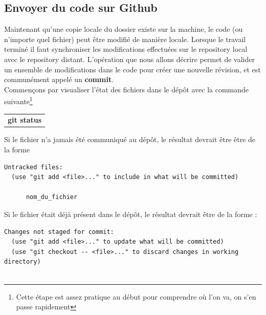 \documentclass[a4paper,10pt]{article}
\begin{document}
\begin{spacing}{1.5}
\subsection*{Envoyer du code sur Github}
Maintenant qu'une copie locale du dossier existe sur la machine, le code (ou
n'importe quel fichier) peut être modifié de manière locale. Lorsque le travail
terminé il faut synchroniser les modifications effectuées sur le repository
local avec le repository distant. L'opération que nous allons décrire permet de valider un
ensemble de modifications dans le code pour créer une nouvelle révision, et est
communément appelé un \textbf{commit}.\\
Commençons par visualiser l'état des fichiers dans le dépôt avec la commande
suivante\footnote{Cette étape est assez pratique au début pour comprendre où
  l'on va, on s'en passe rapidement}
\begin{center}
  \begin{tabular}{c}
    \rowcolor{lightgray!50!white}
      \textbf{git status}
  \end{tabular}
\end{center}
Si le fichier n'a jamais été communiqué au dépôt, le résultat devrait être être
de la forme
\begin{lstlisting}
Untracked files:
  (use "git add <file>..." to include in what will be committed)

      nom_du_fichier
\end{lstlisting}
Si le fichier était déjà présent dans le dépôt, le résultat devrait être de la
forme  :
\begin{lstlisting}
Changes not staged for commit:
  (use "git add <file>..." to update what will be committed)
  (use "git checkout -- <file>..." to discard changes in working directory)


\end{lstlisting}
\end{spacing}
\end{document}
